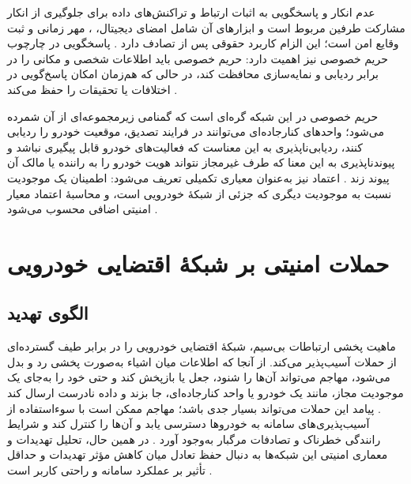 \documentclass[12pt,a4paper]{article}
\begin{document}
عدم انکار  و پاسخگویی  به اثبات ارتباط و تراکنش‌های داده برای جلوگیری از انکار مشارکت طرفین مربوط است و ابزار‌های آن شامل امضای دیجیتال،  ، مهر زمانی و ثبت وقایع امن است؛ این الزام کاربرد حقوقی پس از تصادف دارد \cite{VanetSecurityPrivacy}. پاسخگویی در چارچوب حریم خصوصی نیز اهمیت دارد: حریم خصوصی باید اطلاعات شخصی و مکانی را در برابر ردیابی و نمایه‌سازی محافظت کند، در حالی که هم‌زمان امکان پاسخ‌گویی در اختلافات یا تحقیقات را حفظ می‌کند \cite{VanetSecurityPrivacy}.

حریم خصوصی  در این شبکه گره‌ای است که گمنامی زیرمجموعه‌ای از آن شمرده می‌شود؛ واحد‌های کنارجاده‌ای می‌توانند در فرایند تصدیق، موقعیت خودرو را ردیابی کنند، ردیابی‌ناپذیری به این معناست که فعالیت‌های خودرو قابل پیگیری نباشد و پیوندناپذیری به این معنا که طرف غیرمجاز نتواند هویت خودرو را به راننده یا مالک آن پیوند زند \cite{farsimadanReviewSecurityChallenges2025}. اعتماد  نیز به‌عنوان معیاری تکمیلی تعریف می‌شود: اطمینان یک موجودیت نسبت به موجودیت دیگری که جزئی از شبکهٔ خودرویی است، و محاسبهٔ اعتماد معیار امنیتی اضافی محسوب می‌شود \cite{farsimadanReviewSecurityChallenges2025}.

\section{حملات امنیتی بر شبکهٔ اقتضایی خودرویی}

\subsection{الگوی تهدید}

ماهیت پخشی ارتباطات بی‌سیم، شبکهٔ اقتضایی خودرویی را در برابر طیف گسترده‌ای از حملات آسیب‌پذیر می‌کند. از آنجا که اطلاعات میان اشیاء  به‌صورت پخشی رد و بدل می‌شود، مهاجم می‌تواند آن‌ها را شنود، جعل یا بازپخش کند و حتی خود را به‌جای یک موجودیت مجاز، مانند یک خودرو یا واحد کنارجاده‌ای، جا بزند و داده نادرست ارسال کند \cite{farsimadanReviewSecurityChallenges2025}. پیامد این حملات می‌تواند بسیار جدی باشد؛ مهاجم ممکن است با سوءاستفاده از آسیب‌پذیری‌های سامانه به خودرو‌ها دسترسی یابد و آن‌ها را کنترل کند و شرایط رانندگی خطرناک و تصادفات مرگبار به‌وجود آورد \cite{farsimadanReviewSecurityChallenges2025}. در همین حال، تحلیل تهدیدات و معماری امنیتی این شبکه‌ها به دنبال حفظ تعادل میان کاهش مؤثر تهدیدات و حداقل تأثیر بر عملکرد سامانه و راحتی کاربر است \cite{SecuringVehicularAd,VanetSecurityPrivacy}.
\end{document}
